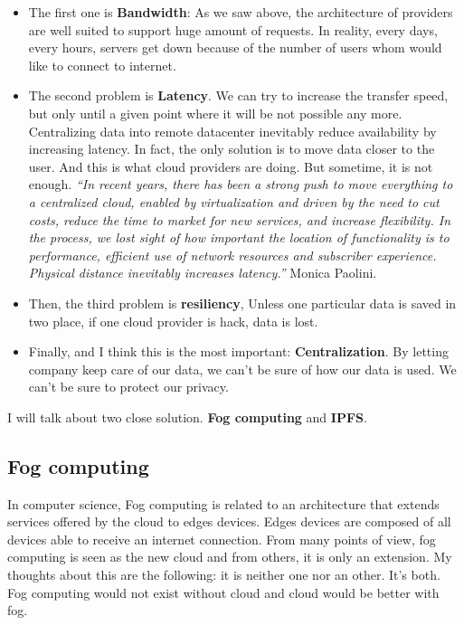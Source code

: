 \begin{itemize}
    \item The first one is \textbf{Bandwidth}: As we saw above, the architecture of providers are well suited to support huge amount of requests. In reality, every days, every hours, servers get down because of the number of users whom would like to connect to internet.
    \item The second problem is \textbf{Latency}. We can try to increase the transfer speed, but only until a given point where it will be not possible any more. Centralizing data into remote datacenter inevitably reduce availability by increasing latency. In fact, the only solution is to move data closer to the user. And this is what cloud providers are doing. But sometime, it is not enough. \textit{“In recent years, there has been a strong push to move everything to a centralized cloud, enabled by virtualization and driven by the need to cut costs, reduce the time to market for new services, and increase flexibility. In the process, we lost sight of how important the location of functionality is to performance, efficient use of network resources and subscriber experience. Physical distance inevitably increases latency.”} Monica Paolini.
    \item Then, the third problem is \textbf{resiliency}, Unless one particular data is saved in two place, if one cloud provider is hack, data is lost.
    \item Finally, and I think this is the most important: \textbf{Centralization}. By letting company keep care of our data, we can’t be sure of how our data is used. We can’t be sure to protect our privacy.
\end{itemize}

I will talk about two close solution. \textbf{Fog computing} and \textbf{IPFS}.

\subsection{Fog computing}

In computer science, Fog computing is related to an architecture that extends services offered by the cloud to edges devices. Edges devices are composed of all devices able to receive an internet connection. From many points of view, fog computing is seen as the new cloud and from others, it is only an extension. My thoughts about this are the following: it is neither one nor an other. It’s both. Fog computing would not exist without cloud and cloud would be better with fog.

